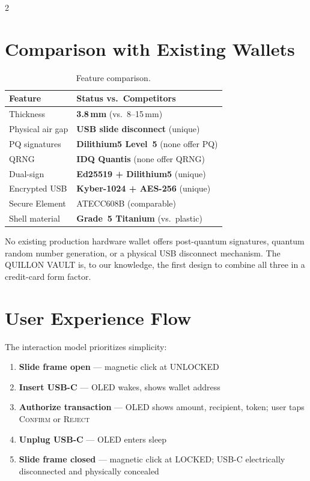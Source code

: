 \documentclass[11pt,a4paper]{article}
\begin{document}
\begin{multicols}{2}
\section{Comparison with Existing Wallets}

\begin{table}[H]
  \centering
  \small
  \caption{Feature comparison.}
  \label{tab:comparison}
  \begin{tabularx}{\columnwidth}{lX}
    \toprule
    \textbf{Feature} & \textbf{Status vs.\ Competitors} \\
    \midrule
    Thickness & \textbf{3.8\,mm} (vs.\ 8--15\,mm) \\
    Physical air gap & \textbf{USB slide disconnect} (unique) \\
    PQ signatures & \textbf{Dilithium5 Level~5} (none offer PQ) \\
    QRNG & \textbf{IDQ Quantis} (none offer QRNG) \\
    Dual-sign & \textbf{Ed25519 + Dilithium5} (unique) \\
    Encrypted USB & \textbf{Kyber-1024 + AES-256} (unique) \\
    Secure Element & ATECC608B (comparable) \\
    Shell material & \textbf{Grade~5 Titanium} (vs.\ plastic) \\
    \bottomrule
  \end{tabularx}
\end{table}

No existing production hardware wallet offers post-quantum signatures,
quantum random number generation, or a physical USB disconnect mechanism.
The QUILLON VAULT is, to our knowledge, the first design to combine all
three in a credit-card form factor.

\section{User Experience Flow}

The interaction model prioritizes simplicity:

\begin{enumerate}[leftmargin=1.2em,itemsep=3pt]
  \item \textbf{Slide frame open} --- magnetic click at UNLOCKED
  \item \textbf{Insert USB-C} --- OLED wakes, shows wallet address
  \item \textbf{Authorize transaction} --- OLED shows amount,
    recipient, token; user taps \textsc{Confirm} or \textsc{Reject}
  \item \textbf{Unplug USB-C} --- OLED enters sleep
  \item \textbf{Slide frame closed} --- magnetic click at LOCKED;
    USB-C electrically disconnected and physically concealed
\end{enumerate}


\end{multicols}
\end{document}
